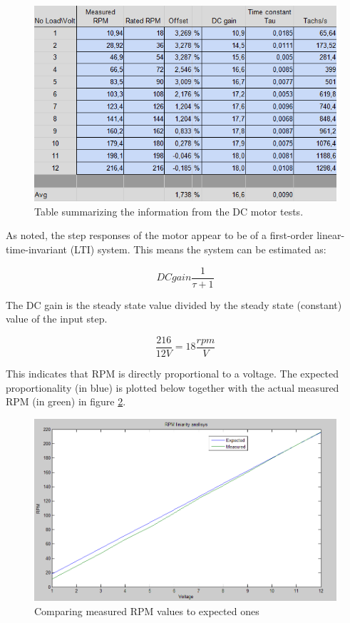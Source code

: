 \begin{figure}[h!]
\centering
\includegraphics[scale=0.7]{Billeder/StepResponseData}
\caption{Table summarizing the information from the DC motor tests.}
\label{fig:StepResponseData}
\end{figure}

As noted, the step responses of the motor appear to be of a first-order linear-time-invariant (LTI) system. This means the system can be estimated as:

\begin{equation}
DCgain\frac{1}{\tau+1}
\end{equation}

The DC gain is the steady state value divided by the steady state (constant) value of the input step.

\begin{equation}
\frac{216}{12V}=18\frac{rpm}{V}
\end{equation}

This indicates that RPM is directly proportional to a voltage. The expected proportionality (in blue) is plotted below together with the actual measured RPM (in green) in figure \ref{fig:RPMLinearityAnalysis}.

\begin{figure}[h!]
\centering
\includegraphics[scale=0.4]{Billeder/RPMLinearityAnalysis.png}
\caption{Comparing measured RPM values to expected ones}
\label{fig:RPMLinearityAnalysis}
\end{figure}

